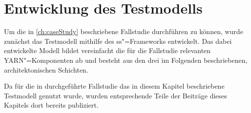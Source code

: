 \chapter{Entwicklung des Testmodells}
\label{ch:model}

Um die in \cref{ch:caseStudy} beschriebene Fallstudie durchführen zu können, wurde zunächst das Testmodell mithilfe des \gls{ss}"=Frameworks entwickelt.
Das dabei entwickelte Modell bildet vereinfacht die für die Fallstudie relevanten \gls{YARN}"=Komponenten ab und besteht aus den drei im Folgenden beschriebenen, architektonischen Schichten.

Da für die in \cite{Eberhardinger2018} durchgeführte Fallstudie das in diesem Kapitel beschriebene Testmodell genutzt wurde, wurden entsprechende Teile der Beiträge dieses Kapitels dort bereits publiziert.








